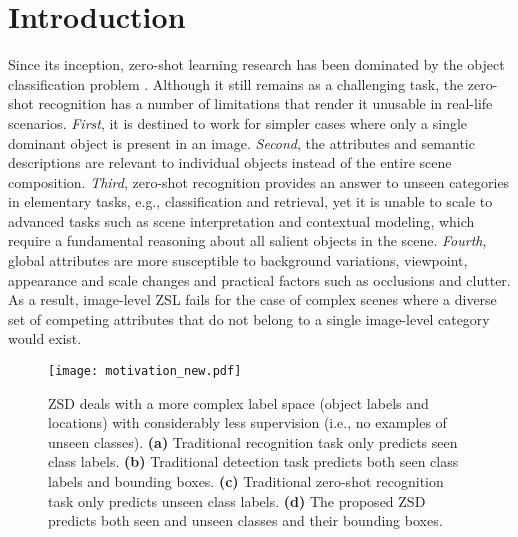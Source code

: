 \documentclass[runningheads]{llncs}
\begin{document}
\section{Introduction} \vspace{-0.5em}
Since its inception, zero-shot learning research has been dominated by the object classification problem \cite{Akata_PAMI_2016,Changpinyo_2016_CVPR,DeViSE_NIPS_2013,Kodirov_2015_ICCV,Lampert_PAMI_2014,Ba_CVPR_2015,bucher_ECCV_2016,norouzi_arXiv_2013,romera_ICML_2015,Xian_CVPR_2017,Zhang_2017_CVPR,Zhang_2015_ICCV,Zhang_2016_CVPR}. Although it still remains as a challenging task, the zero-shot recognition has a number of limitations that render it unusable in real-life scenarios. \emph{First}, it is destined to work for simpler cases where only a single dominant object is present in an image. \emph{Second}, the attributes and semantic descriptions are relevant to individual objects instead of the entire scene composition. \emph{Third}, zero-shot recognition provides an answer to unseen categories in elementary tasks, e.g., classification and retrieval, yet it is unable to scale to advanced tasks such as scene interpretation and contextual modeling, which require a fundamental reasoning about all salient objects in the scene. \emph{Fourth}, global attributes are more susceptible to background variations, viewpoint, appearance and scale changes and practical factors such as occlusions and clutter. As a result, image-level ZSL fails for the case of complex scenes where a diverse set of competing attributes that do not belong to a single image-level category would exist. 

\begin{figure}[t]
  \begin{center}
   \texttt{[image: motivation\_new.pdf]}
\end{center}
  \vspace{-2em}
   \caption{ZSD deals with a more complex label space (object labels and locations) with considerably less supervision (i.e., no examples of unseen classes). \textbf{(a)} Traditional recognition task only predicts seen class labels. \textbf{(b)} Traditional detection task predicts both seen class labels and bounding boxes. \textbf{(c)} Traditional zero-shot recognition task only predicts unseen class labels. \textbf{(d)} The proposed ZSD predicts both seen and unseen classes and their bounding boxes. }
\label{fig:motivation}
\end{figure}
\end{document}
